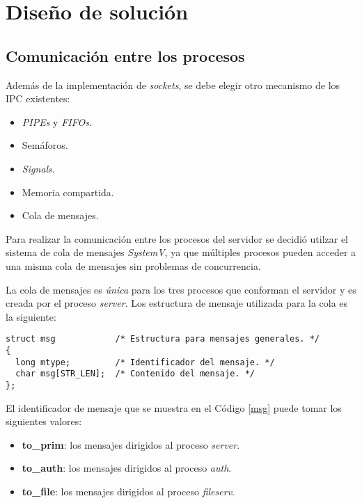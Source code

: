 \documentclass[12pt,a4paper]{article}
\begin{document}
\section{Diseño de solución}
\label{solucion}

\subsection{Comunicación entre los procesos}
\label{ipc}
Además de la implementación de \emph{sockets}, se debe elegir
otro mecanismo de los IPC existentes:

\begin{itemize}[leftmargin=1.5cm]
  \item \emph{PIPEs} y \emph{FIFOs}.
  \item Semáforos.
  \item \emph{Signals}.
  \item Memoria compartida.
  \item Cola de mensajes.
\end{itemize}

Para realizar la comunicación entre los procesos del servidor se
decidió utilzar el sistema de cola de mensajes \emph{SystemV}, ya
que múltiples procesos pueden acceder a una misma cola de mensajes
sin problemas de concurrencia.

La cola de mensajes es \emph{única} para los tres procesos que
conforman el servidor y es creada por el proceso \emph{server}.
Los estructura de mensaje utilizada para la cola es la siguiente:

\begin{lstlisting}[caption={Estructura de mensaje.}, label={msg}, language=Ce]
struct msg            /* Estructura para mensajes generales. */
{
  long mtype;         /* Identificador del mensaje. */
  char msg[STR_LEN];  /* Contenido del mensaje. */
};
\end{lstlisting}

El identificador de mensaje que se muestra en el Código \ref{msg}
puede tomar los siguientes valores:

\begin{itemize}[leftmargin=1.5cm]
  \item \textbf{to\_prim}: los mensajes dirigidos al proceso
  \emph{server}.
  \item \textbf{to\_auth}: los mensajes dirigidos al proceso
  \emph{auth}.
  \item \textbf{to\_file}: los mensajes dirigidos al proceso
  \emph{fileserv}.
\end{itemize}
\end{document}
